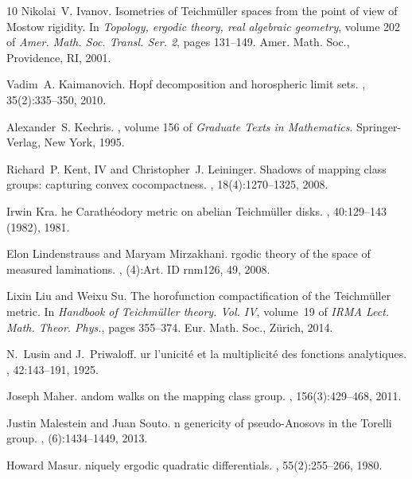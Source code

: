 \documentclass[dvipdfmx]{amsart}
\theoremstyle{remark}
\begin{document}
\begin{thebibliography}{10}
Nikolai~V. Ivanov.
\newblock Isometries of {T}eichm\"uller spaces from the point of view of {M}ostow rigidity.
\newblock In {\em Topology, ergodic theory, real algebraic geometry}, volume 202 of {\em Amer. Math. Soc. Transl. Ser. 2}, pages 131--149. Amer. Math. Soc., Providence, RI, 2001.

Vadim~A. Kaimanovich.
\newblock Hopf decomposition and horospheric limit sets.
, 35(2):335--350, 2010.

Alexander~S. Kechris.
, volume 156 of {\em Graduate Texts in Mathematics}.
\newblock Springer-Verlag, New York, 1995.

Richard~P. Kent, IV and Christopher~J. Leininger.
\newblock Shadows of mapping class groups: capturing convex cocompactness.
, 18(4):1270--1325, 2008.

Irwin Kra.
he {C}arath{\'e}odory metric on abelian {T}eichm{\"u}ller disks.
, 40:129--143 (1982), 1981.

Elon Lindenstrauss and Maryam Mirzakhani.
rgodic theory of the space of measured laminations.
, (4):Art. ID rnm126, 49, 2008.

Lixin Liu and Weixu Su.
\newblock The horofunction compactification of the {T}eichm{\"u}ller metric.
\newblock In {\em Handbook of {T}eichm{\"u}ller theory. {V}ol. {IV}}, volume~19 of {\em IRMA Lect. Math. Theor. Phys.}, pages 355--374. Eur. Math. Soc., Z{\"u}rich, 2014.

N.~Lusin and J.~Priwaloff.
ur l'unicit{\'e} et la multiplicit{\'e} des fonctions analytiques.
, 42:143--191, 1925.

Joseph Maher.
andom walks on the mapping class group.
, 156(3):429--468, 2011.

Justin Malestein and Juan Souto.
n genericity of pseudo-{A}nosovs in the {T}orelli group.
, (6):1434--1449, 2013.

Howard Masur.
niquely ergodic quadratic differentials.
, 55(2):255--266, 1980.


\end{thebibliography}
\end{document}
